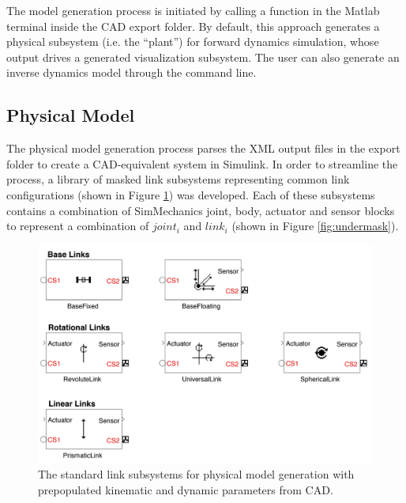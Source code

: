 The model generation process is initiated by calling a function in the Matlab terminal inside the CAD export folder. By default, this approach generates a physical subsystem (i.e. the “plant”) for forward dynamics simulation, whose output drives a generated visualization subsystem. The user can also generate an inverse dynamics model through the command line.

\subsection{Physical Model} %
\label{sub:physical_model}

The physical model generation process parses the XML output files in the export folder to create a CAD-equivalent system in Simulink. In order to streamline the process, a library of masked link subsystems representing common link configurations (shown in Figure \ref{fig:quarcmech}) was developed. Each of these subsystems contains a combination of SimMechanics joint, body, actuator and sensor blocks to represent a combination of $joint_{i}$ and $link_{i}$ (shown in Figure \ref{fig:undermask}).

\begin{figure}[!h]
	\centering
    \includegraphics[scale=0.75]{fig/toolchain/simmech.pdf}
  	\caption{The standard link subsystems for physical model generation with prepopulated kinematic and dynamic parameters from CAD.}
	\label{fig:quarcmech}
\end{figure}

